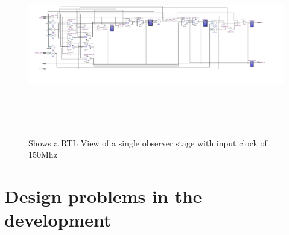 \begin{figure}[]
\centering
\includegraphics[width=650px,height=300px,angle=-90]{../../pictures/22.02.2014/onlyObserver/OBS_150M.jpg}
\caption[RTL View of Observer 0 with clock 150Mhz]{Shows a RTL View of a single observer stage with input clock of 150Mhz}
\label{fig:test:only:150:obs0}
\end{figure}

\newpage
\section{Design problems in the development}

